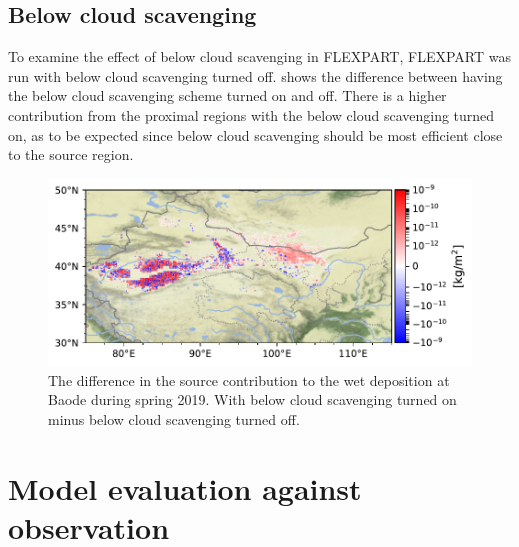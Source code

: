 \subsection{Below cloud scavenging}\label{wet:dep_sensitivty}
To examine the effect of below cloud scavenging in FLEXPART, FLEXPART was run with below cloud scavenging turned off. 
 shows the difference between having the below cloud scavenging scheme turned on and off. 
There is a higher contribution from the proximal regions with the below cloud scavenging turned on, as to be expected since below cloud scavenging should be most efficient close to the source region.  
\begin{figure}[htbp]
    \centering
    \includegraphics[width=\textwidth]{texfiles/figs/no_scav_test.pdf}
    \caption{The difference in the source contribution to the wet deposition at Baode during spring 2019. With below cloud scavenging turned on minus below cloud scavenging turned off.}
    \label{fig:scav_sensitivty}
\end{figure}

\section{Model evaluation against observation}\label{sec:model_eval}


